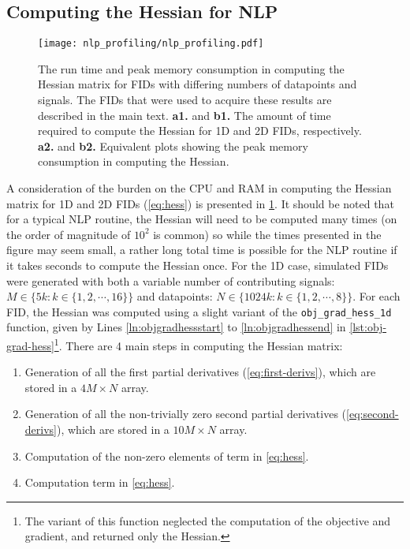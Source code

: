 \subsection{Computing the Hessian for \acs{NLP}}
\begin{figure}
    \centering
    \texttt{[image: nlp\_profiling/nlp\_profiling.pdf]}
    \caption[
        The run time and peak memory consumption in computing the Hessian
        matrix for \acsp{FID} with differing numbers of datapoints and signals.
    ]
    {
        The run time and peak memory consumption in computing the Hessian
        matrix for \acsp{FID} with differing numbers of datapoints and signals.
        The \acp{FID} that were used to acquire these results are described in
        the main text.
        \textbf{a1.} and \textbf{b1.} The amount of time required to compute the
        Hessian for \ac{1D} and \ac{2D} \acp{FID}, respectively.
        \textbf{a2.} and \textbf{b2.} Equivalent plots showing the peak memory
        consumption in computing the Hessian.
    }
    \label{fig:nlp-profiling}
\end{figure}
A consideration of the burden on the \ac{CPU} and \ac{RAM} in computing the
Hessian matrix for \ac{1D} and \ac{2D} \acp{FID} (\cref{eq:hess}) is presented in
\cref{fig:nlp-profiling}.
It should be noted that for a typical \ac{NLP} routine, the Hessian will need
to be computed many times (on the order of magnitude of $10^2$ is common) so
while the times presented in the figure may seem small, a rather long total
time is possible for the \ac{NLP} routine if it takes seconds to compute the
Hessian once.
For the \ac{1D} case, simulated \acp{FID} were generated
with both a variable number of contributing signals: $M \in \lbrace 5k : k \in
\lbrace 1, 2, \cdots, 16 \rbrace \rbrace$ and datapoints: $N \in \lbrace 1024k
: k \in \lbrace 1, 2, \cdots, 8 \rbrace \rbrace$. For each \ac{FID}, the Hessian
was computed using a slight variant of the \texttt{obj\_grad\_hess\_1d}
function, given by Lines \ref{ln:objgradhessstart} to
\ref{ln:objgradhessend} in \cref{lst:obj-grad-hess}\footnote{
    The variant of this function neglected the computation of the objective and
    gradient, and returned only the Hessian.
}. There are 4 main steps in computing the Hessian matrix:
\begin{enumerate}
    \item Generation of all the first partial derivatives
        (\cref{eq:first-derivs}), which are stored in a $4M \times N$ array.
    \item Generation of all the non-trivially zero second partial
        derivatives (\cref{eq:second-derivs}), which are stored in a $10M
        \times N$ array.
    \item Computation of the non-zero elements of term  in
        \cref{eq:hess}.
    \item Computation term  in \cref{eq:hess}.
\end{enumerate}
